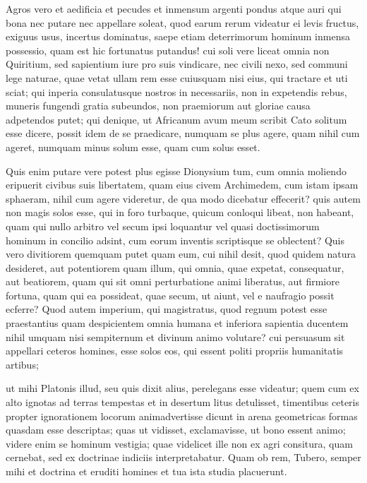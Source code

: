  Agros vero et aedificia et pecudes et inmensum argenti pondus atque auri qui bona nec putare nec appellare soleat, quod earum rerum videatur ei levis fructus, exiguus usus, incertus dominatus, saepe etiam deterrimorum hominum inmensa possessio, quam est hic fortunatus putandus! cui soli vere liceat omnia non Quiritium, sed sapientium iure pro suis vindicare, nec civili nexo, sed communi lege naturae, quae vetat ullam rem esse cuiusquam nisi eius, qui tractare et uti sciat; qui inperia consulatusque nostros in necessariis, non in expetendis rebus, muneris fungendi gratia subeundos, non praemiorum aut gloriae causa adpetendos putet; qui denique, ut Africanum avum meum scribit Cato solitum esse dicere, possit idem de se praedicare, numquam se plus agere, quam nihil cum ageret, numquam minus solum esse, quam cum solus esset.

 Quis enim putare vere potest plus egisse Dionysium tum, cum omnia moliendo eripuerit civibus suis libertatem, quam eius civem Archimedem, cum istam ipsam sphaeram, nihil cum agere videretur, de qua modo dicebatur effecerit? quis autem non magis solos esse, qui in foro turbaque, quicum conloqui libeat, non habeant, quam qui nullo arbitro vel secum ipsi loquantur vel quasi doctissimorum hominum in concilio adsint, cum eorum inventis scriptisque se oblectent? Quis vero divitiorem quemquam putet quam eum, cui nihil desit, quod quidem natura desideret, aut potentiorem quam illum, qui omnia, quae expetat, consequatur, aut beatiorem, quam qui sit omni perturbatione animi liberatus, aut firmiore fortuna, quam qui ea possideat, quae secum, ut aiunt, vel e naufragio possit ecferre? Quod autem imperium, qui magistratus, quod regnum potest esse praestantius quam despicientem omnia humana et inferiora sapientia ducentem nihil umquam nisi sempiternum et divinum animo volutare? cui persuasum sit appellari ceteros homines, esse solos eos, qui essent politi propriis humanitatis artibus;

 ut mihi Platonis illud, seu quis dixit alius, perelegans esse videatur; quem cum ex alto ignotas ad terras tempestas et in desertum litus detulisset, timentibus ceteris propter ignorationem locorum animadvertisse dicunt in arena geometricas formas quasdam esse descriptas; quas ut vidisset, exclamavisse, ut bono essent animo; videre enim se hominum vestigia; quae videlicet ille non ex agri consitura, quam cernebat, sed ex doctrinae indiciis interpretabatur. Quam ob rem, Tubero, semper mihi et doctrina et eruditi homines et tua ista studia placuerunt.

